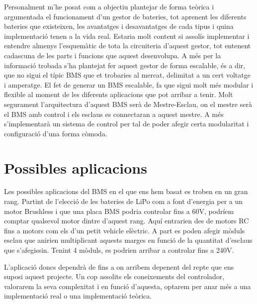 Personalment m'he posat com a objectiu plantejar de forma teòrica i argumentada el funcionament d'un gestor de bateries, tot aprenent les diferents bateries que existeixen, les avantatges i desavantatges de cada tipus i quina implementació tenen a la vida real. Estaria molt content si assolís implementar i entendre almenys l'esquemàtic de tota la circuiteria d'aquest gestor, tot entenent cadascuna de les parts i funcions que aquest desenvolupa. A més per la informació trobada s'ha plantejat fer aquest gestor de forma escalable, és a dir, que no sigui el típic BMS que et trobaries al mercat, delimitat a un cert voltatge i amperatge. El fet de generar un BMS escalable, fa que sigui molt més modular i flexible al moment de les diferents aplicacions que pot arribar a tenir. Molt segurament l'arquitectura d'aquest BMS serà de Mestre-Esclau, on el mestre serà el BMS amb control i els esclaus es connectaran a aquest mestre.
A més s'implementarà un sistema de control per tal de poder afegir certa modularitat i configuració d'una forma còmoda. 

\section{Possibles aplicacions} 

Les possibles aplicacions del BMS en el que ens hem basat es troben en un gran rang. Partint de l'elecció de les bateries de LiPo com a font d'energia per a un motor Brushless i que una placa BMS podria controlar fins a 60V, podríem comptar qualsevol motor dintre d'aquest rang. Aquí entrarien des de motors RC fins a motors com els d'un petit vehicle elèctric. A part es poden afegir mòduls esclau que anirien multiplicant aquests marges en funció de la quantitat d'esclaus que s'afegissin. Tenint 4 mòduls, es podrien arribar a controlar fins a 240V.

L'aplicació doncs dependrà de fins a on arribem depenent del repte que ens suposi aquest projecte. Un cop assolits els coneixements del controlador, valorarem la seva complexitat i en funció d'aquesta, optarem per anar més a una implementació real o una implementació teòrica.




